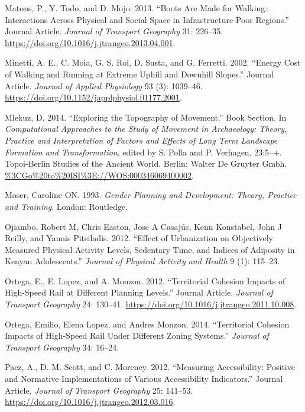 \documentclass[]{elsarticle} %
\begin{document}
\leavevmode\hypertarget{ref-Matous2013}{}%
Matous, P., Y. Todo, and D. Mojo. 2013. ``Boots Are Made for Walking:
Interactions Across Physical and Social Space in Infrastructure-Poor
Regions.'' Journal Article. \emph{Journal of Transport Geography} 31:
226--35. \url{https://doi.org/10.1016/j.jtrangeo.2013.04.001}.

\leavevmode\hypertarget{ref-Minetti2002}{}%
Minetti, A. E., C. Moia, G. S. Roi, D. Susta, and G. Ferretti. 2002.
``Energy Cost of Walking and Running at Extreme Uphill and Downhill
Slopes.'' Journal Article. \emph{Journal of Applied Physiology} 93 (3):
1039--46. \url{https://doi.org/10.1152/japplphysiol.01177.2001}.

\leavevmode\hypertarget{ref-Mlekuz2014}{}%
Mlekuz, D. 2014. ``Exploring the Topography of Movement.'' Book Section.
In \emph{Computational Approaches to the Study of Movement in
Archaeology: Theory, Practice and Interpretation of Factors and Effects
of Long Term Landscape Formation and Transformation}, edited by S. Polla
and P. Verhagen, 23:5--+. Topoi-Berlin Studies of the Ancient World.
Berlin: Walter De Gruyter Gmbh.
\url{\%3CGo\%20to\%20ISI\%3E://WOS:000346069400002}.

\leavevmode\hypertarget{ref-Moser1993gender}{}%
Moser, Caroline ON. 1993. \emph{Gender Planning and Development: Theory,
Practice and Training}. London: Routledge.

\leavevmode\hypertarget{ref-ojiambo2012}{}%
Ojiambo, Robert M, Chris Easton, Jose A Casajús, Kenn Konstabel, John J
Reilly, and Yannis Pitsiladis. 2012. ``Effect of Urbanization on
Objectively Measured Physical Activity Levels, Sedentary Time, and
Indices of Adiposity in Kenyan Adolescents.'' \emph{Journal of Physical
Activity and Health} 9 (1): 115--23.

\leavevmode\hypertarget{ref-Ortega2012}{}%
Ortega, E., E. Lopez, and A. Monzon. 2012. ``Territorial Cohesion
Impacts of High-Speed Rail at Different Planning Levels.'' Journal
Article. \emph{Journal of Transport Geography} 24: 130--41.
\url{https://doi.org/10.1016/j.jtrangeo.2011.10.008}.

\leavevmode\hypertarget{ref-Ortega2014}{}%
Ortega, Emilio, Elena Lopez, and Andres Monzon. 2014. ``Territorial
Cohesion Impacts of High-Speed Rail Under Different Zoning Systems.''
\emph{Journal of Transport Geography} 34: 16--24.

\leavevmode\hypertarget{ref-Paez2012positive}{}%
Paez, A., D. M. Scott, and C. Morency. 2012. ``Measuring Accessibility:
Positive and Normative Implementations of Various Accessibility
Indicators.'' Journal Article. \emph{Journal of Transport Geography} 25:
141--53. \url{https://doi.org/10.1016/j.jtrangeo.2012.03.016}.
\end{document}
